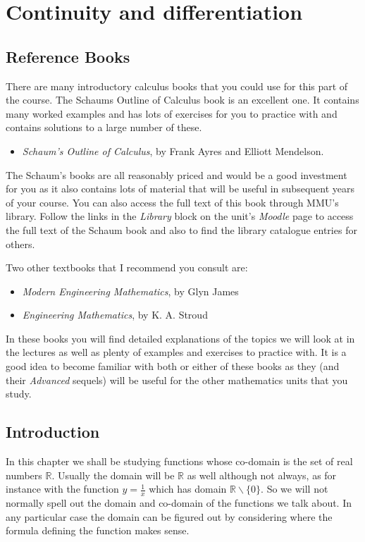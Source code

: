\documentclass[extrafontsizes, twoside, a4paper]{memoir}
\theoremstyle{plain}%
\theoremstyle{definition}
\theoremstyle{remark}
\begin{document}
\chapter[Continuity \& differentiation]{Continuity and differentiation}
\section{Reference Books}
There are many introductory calculus books that you could use for this part of the course. The Schaums Outline of Calculus book is an excellent one. It contains many worked examples and has lots of exercises for you to practice with and contains solutions to a large number of these.
\begin{itemize}
\item
\textit{Schaum's Outline of Calculus}, by Frank Ayres and Elliott Mendelson.
\end{itemize}
The Schaum's books are all reasonably priced and would be a good investment for you as it also contains lots of material that will be useful in subsequent years of your course. You can also access the full text of this book through MMU's library. Follow the links in the \textit{Library} block on the unit's \textit{Moodle} page to access the full text of the Schaum book and also to find the library catalogue entries for others.

Two other textbooks that I recommend you consult are:
\begin{itemize}
\item
\textit{Modern Engineering Mathematics}, by Glyn James
\item
\textit{Engineering Mathematics}, by K. A. Stroud
\end{itemize}
In these books you will find detailed explanations of the topics we will look at in the lectures as well as plenty of examples and exercises to practice with. It is a good idea to become familiar with both or either of these books as they (and their \textit{Advanced} sequels) will be useful for the other mathematics units that you study.

\section{Introduction}
In this chapter we shall be studying functions whose co-domain is the set of real numbers $\mathbb{R}$. Usually the domain will be $\mathbb{R}$ as well although not always, as for instance with the function $y = \frac{1}{x}$ which has domain $\mathbb{R} \backslash \{ 0 \}$. So we will not normally spell out the domain and co-domain of the functions we talk about. In any particular case the domain can be figured out by considering where the formula defining the function makes sense.
\end{document}
